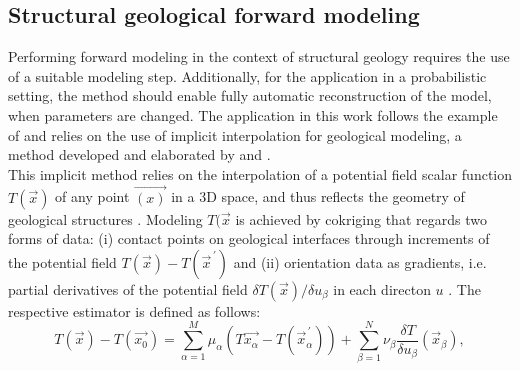         \subsection{Structural geological forward modeling}\label{sec:struc_geo_modeling}       
        Performing forward modeling in the context of structural geology requires the use of a suitable modeling step. Additionally, for the application in a probabilistic setting, the method should enable fully automatic reconstruction of the model, when parameters are changed. The application in this work follows the example of \citet{delaVarga2016} and relies on the use of implicit interpolation for geological modeling, a method developed and elaborated by \citet{Lajaunie1997} and \citet{calcagno2008geological}.\\
        This implicit method relies on the interpolation of a potential field scalar function $T(\vec{x})$ of any point $\vec{(x)}$ in a 3D space, and thus reflects the geometry of geological structures \citep{calcagno2008geological}. Modeling $T(\vec{x}$ is achieved by cokriging that regards two forms of data: (i) contact points on geological interfaces through increments of the potential field $T(\vec{x})-T(\vec{x}^{\,'})$ and (ii) orientation data as gradients, i.e. partial derivatives of the potential field $\delta T(\vec{x})/\delta u_\beta$ in each directon $u$ \citep{calcagno2008geological}. The respective estimator is defined as follows:
        \begin{equation}\label{eq:Cokriging_Estimator}
                T(\vec{x})-T(\vec{x_0})=\sum_{\alpha=1}^{M}\mu_\alpha(T\vec{x_\alpha}-T(\vec{x}^{\,'}_\alpha))+\sum_{\beta=1}^{N}\nu_\beta\frac{\delta T}{\delta u_\beta}(\vec{x}_\beta),
        \end{equation}
        
